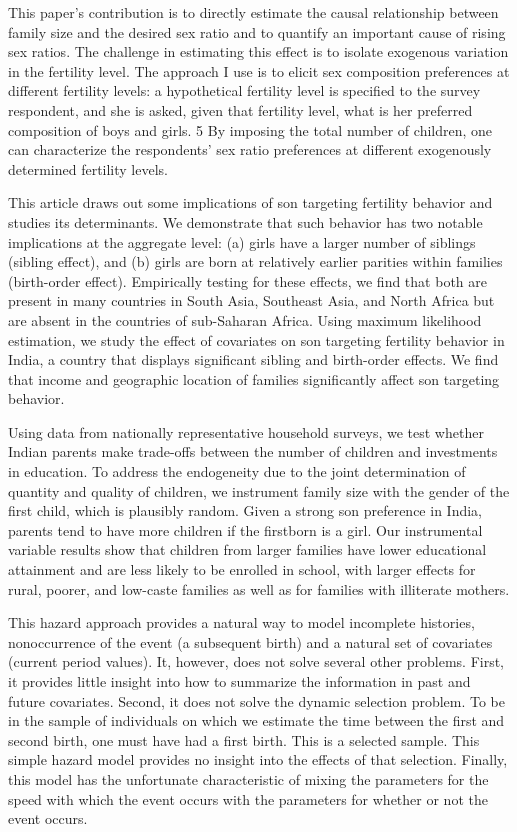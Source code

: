This paper’s contribution is to directly estimate the causal relationship between family size and the desired sex ratio and to quantify an important cause of rising sex ratios. The challenge in estimating this effect is to isolate exogenous variation in the fertility level. The approach I use is to elicit sex composition preferences at different fertility levels: a hypothetical fertility level is specified to the survey respondent, and she is asked, given that fertility level, what is her preferred composition of boys and
girls. 5 By imposing the total number of children, one can characterize the respondents’ sex ratio preferences at different exogenously determined fertility levels.


\citep{Basu2010}

This article draws out some implications of son targeting fertility behavior and studies its determinants. We demonstrate that such behavior has two notable implications at the aggregate level: (a) girls have a larger number of siblings (sibling effect), and (b) girls are born at relatively earlier parities within families (birth-order effect). Empirically testing for these effects, we find that both are present in many countries in South Asia, Southeast Asia, and North Africa but are absent in the countries of sub-Saharan Africa. Using maximum likelihood estimation, we study the effect of covariates on son targeting fertility behavior in India, a country that displays significant sibling and birth-order effects. We find that income and geographic location of families significantly affect son targeting behavior.

\citep{Kugler2017}

Using data from nationally representative household surveys, we test whether Indian parents make trade-offs between the number of children and investments in education. To address the endogeneity due to the joint determination of quantity and quality of children, we instrument family size with the gender of the first child, which is plausibly random. Given a strong son preference in India, parents tend to have more children if the firstborn is a girl. Our instrumental variable results show that children from larger families have lower educational attainment and are less likely to be enrolled in school, with larger effects for rural, poorer, and low-caste families as well as for families with illiterate mothers.

\citep{Hotz1997}

This hazard approach provides a natural way to model incomplete histories, nonoccurrence of the event (a subsequent birth) and a natural set of covariates (current period values). It, however, does not solve several other problems. First, it provides
little insight into how to summarize the information in past and future covariates. Second, it does not solve the dynamic selection problem. To be in the sample of individuals on which we estimate the time between the first and second birth, one must have had a first birth. This is a selected sample. This simple hazard model provides no insight into the effects of that selection. Finally, this model has the unfortunate characteristic of mixing the parameters for the speed with which the event occurs with the parameters for whether or not the event occurs.


